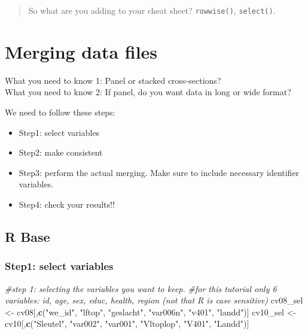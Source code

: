 \documentclass[
]{book}
\newenvironment{Shaded}{\begin{snugshade}}{\end{snugshade}}
\newcommand{\CommentTok}[1]{\textcolor[rgb]{0.56,0.35,0.01}{\textit{#1}}}
\newcommand{\KeywordTok}[1]{\textcolor[rgb]{0.13,0.29,0.53}{\textbf{#1}}}
\newcommand{\NormalTok}[1]{#1}
\newcommand{\StringTok}[1]{\textcolor[rgb]{0.31,0.60,0.02}{#1}}
\providecommand{\tightlist}{%
  \setlength{\itemsep}{0pt}\setlength{\parskip}{0pt}}
\begin{document}
\begin{quote}
So what are you adding to your cheat sheet? \texttt{rowwise()}, \texttt{select()}.
\end{quote}

\hypertarget{merging-data-files}{%
\section{Merging data files}\label{merging-data-files}}

What you need to know 1: Panel or stacked cross-sections?\\
What you need to know 2: If panel, do you want data in long or wide format?

We need to follow these steps:

\begin{itemize}
\tightlist
\item
  Step1: select variables
\item
  Step2: make consistent
\item
  Step3: perform the actual merging. Make sure to include necessary identifier variables.
\item
  Step4: check your results!!
\end{itemize}

\hypertarget{r-base-3}{%
\subsection{R Base}\label{r-base-3}}

\hypertarget{step1-select-variables}{%
\subsubsection{Step1: select variables}\label{step1-select-variables}}

\begin{Shaded}
\begin{Highlighting}[numbers=left,,]
\CommentTok{#step 1: selecting the variables you want to keep.}
\CommentTok{#for this tutorial only 6 variables: id, age, sex, educ, health, region (not that R is case sensitive)}
\NormalTok{cv08_sel <-}\StringTok{ }\NormalTok{cv08[,}\KeywordTok{c}\NormalTok{(}\StringTok{"we_id"}\NormalTok{, }\StringTok{"lftop"}\NormalTok{, }\StringTok{"geslacht"}\NormalTok{, }\StringTok{"var006n"}\NormalTok{, }\StringTok{"v401"}\NormalTok{, }\StringTok{"landd"}\NormalTok{)]}
\NormalTok{cv10_sel <-}\StringTok{ }\NormalTok{cv10[,}\KeywordTok{c}\NormalTok{(}\StringTok{"Sleutel"}\NormalTok{, }\StringTok{"var002"}\NormalTok{, }\StringTok{"var001"}\NormalTok{, }\StringTok{"Vltoplop"}\NormalTok{, }\StringTok{"V401"}\NormalTok{, }\StringTok{"Landd"}\NormalTok{)]}
\end{Highlighting}
\end{Shaded}
\end{document}
